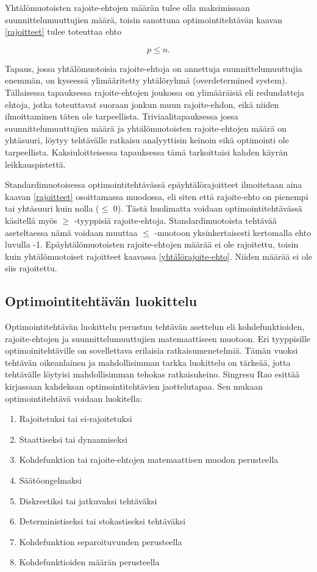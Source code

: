 \documentclass[12pt]{article}
\newenvironment{content}{\pagenumbering{arabic}}{}
\begin{document}
\begin{content}
Yhtälömuotoisten rajoite-ehtojen määrän tulee olla maksimissaan suunnittelumuuttujien määrä, toisin sanottuna optimointitehtävän kaavan \eqref{rajoitteet} tulee toteuttaa ehto

\begin{equation}
\label{yhtälörajoite-ehto}
p \leq n.
\end{equation}

Tapaus, jossa yhtälömuotoisia rajoite-ehtoja on annettuja suunnittelumuuttujia enemmän, on kyseessä ylimääritetty yhtälöryhmä (overdetermined system). Tällaisessa tapauksessa rajoite-ehtojen joukossa on ylimääräisiä eli redundatteja ehtoja, jotka toteuttavat suoraan jonkun muun rajoite-ehdon, eikä niiden ilmoittaminen täten ole tarpeellista. Triviaalitapauksessa jossa suunnittelumuuttujien määrä ja yhtälömuotoisten rajoite-ehtojen määrä on yhtäsuuri, löytyy tehtävälle ratkaisu analyyttisin keinoin eikä optimointi ole tarpeellista. Kaksiuloitteisessa tapauksessa tämä tarkoittaisi kahden käyrän leikkauspistettä. 

Standardimuotoisessa optimointitehtävässä epäyhtälörajoitteet ilmoitetaan aina kaavan \eqref{rajoitteet} osoittamassa muodossa, eli siten että rajoite-ehto on pienempi tai yhtäsuuri kuin nolla ($\leq$ 0). Tästä huolimatta voidaan optimointitehtävässä käsitellä myös $\geq$ -tyyppisiä rajoite-ehtoja. Standardimuotoista tehtävää aseteltaessa nämä voidaan muuttaa $\leq$ -muotoon yksinkertaisesti kertomalla ehto luvulla -1. Epäyhtälömuotoisten rajoite-ehtojen määrää ei ole rajoitettu, toisin kuin yhtälömuotoiset rajoitteet kaavassa \eqref{yhtälörajoite-ehto}. Niiden määrää ei ole siis rajoitettu.   \parencite[43]{arora}

\subsection{Optimointitehtävän luokittelu}

Optimointitehtävän luokittelu perustuu tehtävän asettelun eli kohdefunktioiden, rajoite-ehtojen ja suunnittelumuuttujien matemaattiseen muotoon. Eri tyyppisille optimoinitehtäville on sovellettava erilaisia ratkaisumenetelmiä. Tämän vuoksi tehtävän oikeanlainen ja mahdollisimman tarkka luokittelu on tärkeää, jotta tehtävälle löytyisi mahdollisimman tehokas ratkaisukeino. Singresu Rao esittää kirjassaan \parencite{rao} kahdeksan optimointitehtävien jaottelutapaa. Sen mukaan optimointitehtävä voidaan luokitella:

\begin{enumerate}
\item Rajoitetuksi tai ei-rajoitetuksi
\item Staattiseksi tai dynaamiseksi
\item Kohdefunktion tai rajoite-ehtojen matemaattisen muodon perusteella
\item Säätöongelmaksi
\item Diskreetiksi tai jatkuvaksi tehtäväksi
\item Deterministiseksi tai stokastiseksi tehtäväksi
\item Kohdefunktion separoituvuuden perusteella
\item Kohdefunktioiden määrän perusteella
\end{enumerate}


\end{content}
\end{document}
